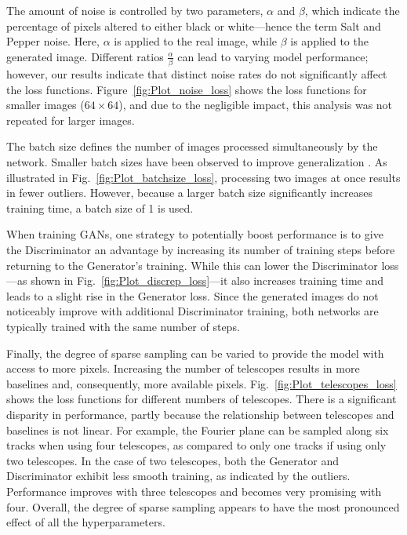 The amount of noise is controlled by two parameters, \(\alpha\) and \(\beta\), which indicate the percentage of pixels altered to either black or white—hence the term Salt and Pepper noise. Here, \(\alpha\) is applied to the real image, while \(\beta\) is applied to the generated image. Different ratios \(\frac{\alpha}{\beta}\) can lead to varying model performance; however, our results indicate that distinct noise rates do not significantly affect the loss functions. Figure~\ref{fig:Plot_noise_loss} shows the loss functions for smaller images ($64 \times 64$), and due to the negligible impact, this analysis was not repeated for larger images.

The batch size defines the number of images processed simultaneously by the network. Smaller batch sizes have been observed to improve generalization \citep{prince2023understanding}. As illustrated in Fig.~\ref{fig:Plot_batchsize_loss}, processing two images at once results in fewer outliers. However, because a larger batch size significantly increases training time, a batch size of 1 is used.

When training GANs, one strategy to potentially boost performance is to give the Discriminator an advantage by increasing its number of training steps before returning to the Generator's training. While this can lower the Discriminator loss—as shown in Fig.~\ref{fig:Plot_discrep_loss}—it also increases training time and leads to a slight rise in the Generator loss. Since the generated images do not noticeably improve with additional Discriminator training, both networks are typically trained with the same number of steps.

Finally, the degree of sparse sampling can be varied to provide the model with access to more pixels. Increasing the number of telescopes results in more baselines and, consequently, more available pixels. Fig.~\ref{fig:Plot_telescopes_loss} shows the loss functions for different numbers of telescopes. There is a significant disparity in performance, partly because the relationship between telescopes and baselines is not linear. For example, the Fourier plane can be sampled along six tracks when using four telescopes, as compared to only one tracks if using only two telescopes. In the case of two telescopes, both the Generator and Discriminator exhibit less smooth training, as indicated by the outliers. Performance improves with three telescopes and becomes very promising with four. Overall, the degree of sparse sampling appears to have the most pronounced effect of all the hyperparameters.
